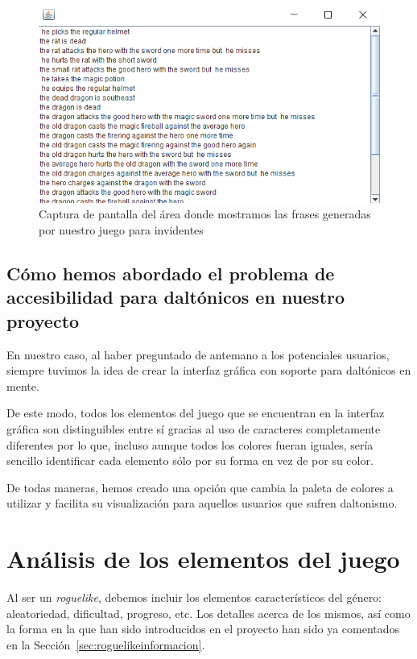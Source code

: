 \begin{figure}[H]
		\includegraphics[width=\textwidth,height=\textheight,keepaspectratio]{./img/roomsGameTextArea.png}
	\caption{Captura de pantalla del área donde mostramos las frases generadas por nuestro juego para invidentes}
	\label{fig:roomsgametextarea}
\end{figure}

\subsection{Cómo hemos abordado el problema de accesibilidad para daltónicos en nuestro proyecto}
\label{sec:solventadodaltonicos}

En nuestro caso, al haber preguntado de antemano a los potenciales usuarios, siempre tuvimos la idea de crear la interfaz gráfica con soporte para daltónicos en mente.

De este modo, todos los elementos del juego que se encuentran en la interfaz gráfica son distinguibles entre sí gracias al uso de caracteres completamente diferentes por lo que, incluso aunque todos los colores fueran iguales, sería sencillo identificar cada elemento sólo por su forma en vez de por su color. 

De todas maneras, hemos creado una opción que cambia la paleta de colores a utilizar y facilita su visualización para aquellos usuarios que sufren daltonismo.

\section{Análisis de los elementos del juego}
Al ser un \textit{roguelike}, debemos incluir los elementos característicos del género: aleatoriedad, dificultad, progreso, etc. Los detalles acerca de los mismos, así como la forma en la que han sido introducidos en el proyecto han sido ya comentados en la Sección~\ref{sec:roguelikeinformacion}.

